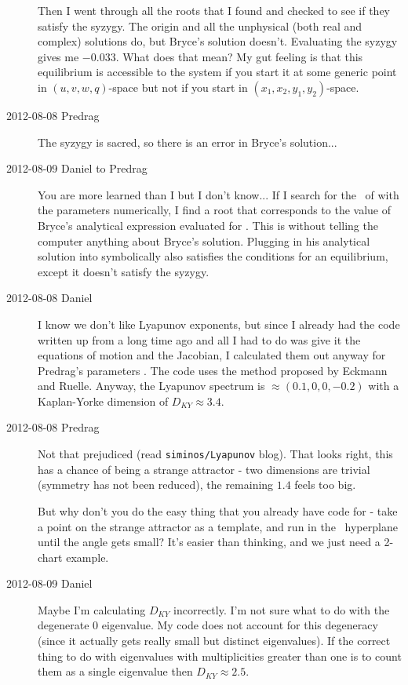 \begin{description}
Then I went through all the roots that I found and checked to see if they
satisfy the syzygy. The origin and all the unphysical (both real and
complex) solutions do, but Bryce's solution doesn't. Evaluating the
syzygy gives me $-0.033$. What does that mean? My gut feeling is that
this equilibrium is accessible to the system if you start it at some
generic point in $(u,v,w,q)$-space but not if you start in
$(x_1,x_2,y_1,y_2)$-space.

\item[2012-08-08 Predrag]
The syzygy  is sacred, so there is an error in
Bryce's solution...

\item[2012-08-09 Daniel to Predrag] You are more learned than I but I don't know...
If I search for the \eqva\ of  with the parameters 
numerically, I find a root that corresponds to the value of Bryce's analytical
expression  evaluated for . This is without telling
the computer anything about Bryce's solution. Plugging in his analytical solution into
 symbolically also satisfies the conditions for an equilibrium, except
it doesn't satisfy the syzygy.

\item[2012-08-08 Daniel] I know we don't like Lyapunov exponents, but
since I already had the code written up from a long time ago and all I
had to do was give it the equations of motion and the Jacobian, I
calculated them out anyway for Predrag's parameters
. The code uses the method proposed by Eckmann and
Ruelle. Anyway, the Lyapunov spectrum is $\approx
(0.1,0,0,-0.2)$ with a Kaplan-Yorke dimension of $D_{KY} \approx 3.4$.

\item[2012-08-08 Predrag]
Not that prejudiced (read \texttt{siminos/Lyapunov} blog). That looks
right, this has a chance of being a strange attractor - two dimensions
are trivial (symmetry has not been reduced), the remaining $1.4$ feels
too big.

But why don't you do the easy thing that you already have code for - take
a point on the strange attractor as a template, and run in the \slice\
hyperplane until the angle  gets small? It's easier
than thinking, and we just need a 2-chart example.

\item[2012-08-09 Daniel] Maybe I'm calculating $D_{KY}$ incorrectly. I'm not
sure what to do with the degenerate $0$ eigenvalue. My code does not account
for this degeneracy (since it actually gets really small but distinct eigenvalues).
If the correct thing to do with eigenvalues with multiplicities greater than one
is to count them as a single eigenvalue then $D_{KY} \approx 2.5$.


\end{description}
